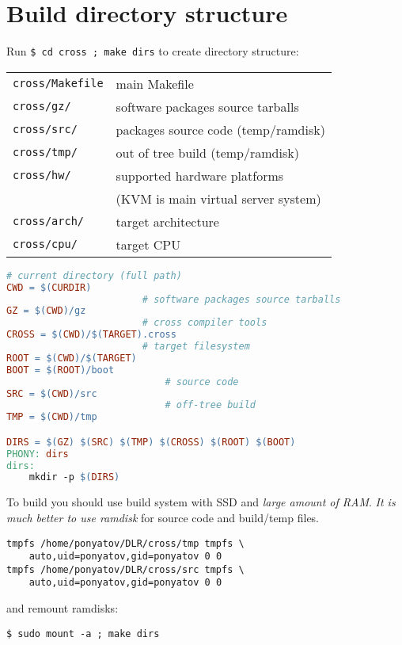 \clearpage
{}%

\clearpage
\section{Build directory structure}

Run \verb|$ cd cross ; make dirs| to create directory structure:

\bigskip
\begin{tabular}{l l}
\verb|cross/Makefile| & main Makefile \\
\verb|cross/gz/| & software packages source tarballs \\
\verb|cross/src/| & packages source code (temp/ramdisk)\\
\verb|cross/tmp/| & out of tree build (temp/ramdisk)\\
\verb|cross/hw/| & supported hardware platforms\\
				&(KVM is main virtual server system)\\
\verb|cross/arch/| & target architecture\\
\verb|cross/cpu/| & target CPU\\
\end{tabular}

\clearpage

\begin{lstlisting}[language=make]
						# current directory (full path)
CWD = $(CURDIR)
						# software packages source tarballs
GZ = $(CWD)/gz
						# cross compiler tools						
CROSS = $(CWD)/$(TARGET).cross
						# target filesystem
ROOT = $(CWD)/$(TARGET)
BOOT = $(ROOT)/boot
							# source code
SRC = $(CWD)/src
							# off-tree build
TMP = $(CWD)/tmp

DIRS = $(GZ) $(SRC) $(TMP) $(CROSS) $(ROOT) $(BOOT)
PHONY: dirs
dirs:
	mkdir -p $(DIRS)
\end{lstlisting}

To build you should use build system with SSD and \emph{large amount of RAM}.
\emph{It is much better to use ramdisk} for source code and build/temp files.

\begin{lstlisting}[title=add this to /etc/fstab (change to your home/gid/uid)]
tmpfs /home/ponyatov/DLR/cross/tmp tmpfs \
	auto,uid=ponyatov,gid=ponyatov 0 0
tmpfs /home/ponyatov/DLR/cross/src tmpfs \
	auto,uid=ponyatov,gid=ponyatov 0 0
\end{lstlisting}
and remount ramdisks:
\begin{lstlisting}
$ sudo mount -a ; make dirs
\end{lstlisting}

